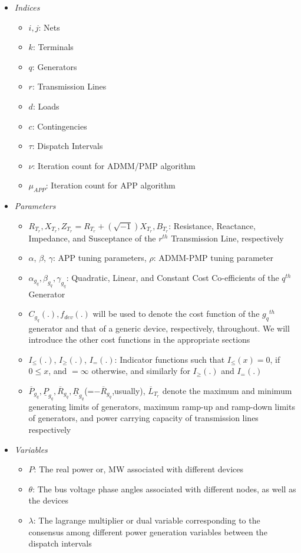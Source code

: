 \documentclass[preprint,12pt,3p]{elsarticle}
\begin{document}
\begin{itemize}
\begin{itemize}[label={}]
		\end{itemize}
		\item \textit{Indices}
		\begin{itemize}[label={}]
			\item $i,j$: Nets
			\item $k$: Terminals
			\item $q$: Generators
			\item $r$: Transmission Lines
			\item $d$: Loads
			\item $c$: Contingencies
			\item $\tau$: Dispatch Intervals
			\item $\nu$: Iteration count for ADMM/PMP algorithm
			\item $\mu_{APP}$: Iteration count for APP algorithm
		\end{itemize}
		\item \textit{Parameters}
		\begin{itemize}[label={}]
			\item $R_{T_r}, X_{T_r}, Z_{T_r}=R_{T_r}+(\sqrt{-1})X_{T_r},  B_{T_r}$: Resistance, Reactance, Impedance, and Susceptance of the $r^{th}$ Transmission Line, respectively
			\item $\alpha$, $\beta$, $\gamma$: APP tuning parameters, $\rho$: ADMM-PMP tuning parameter
			\item $\alpha_{g_q}, \beta_{g_q}, \gamma_{g_q}$: Quadratic, Linear, and Constant Cost Co-efficients of the $q^{th}$ Generator
			\item $C_{g_q}(.), f_{dev}(.)$ will be used to denote the cost function of the ${g_q}^{th}$ generator and that of a generic device, respectively, throughout. We will introduce the other cost functions in the appropriate sections
			\item $I_{\leq}(.)$, $I_{\geq}(.)$, $ I_{=}(.)$: Indicator functions such that $I_{\leq}(x)=0$, if $0\leq x$, and $=\infty$ otherwise, and similarly for $I_{\geq}(.)$ and $ I_{=}(.)$ 
			\item $\overline{P}_{g_q},\underline{P}_{g_q}, \overline{R}_{g_q},\underline{R}_{g_q}$(=$-\overline{R}_{g_q}$,usually), $\overline{L}_{T_r}$ denote the maximum and minimum generating limits of generators, maximum ramp-up and ramp-down limits of generators, and power carrying capacity of transmission lines respectively
		\end{itemize}
		\item \textit{Variables}
		\begin{itemize}[label={}]
			\item $P$: The real power or, MW associated with different devices
			\item $\theta$: The bus voltage phase angles associated with different nodes, as well as the devices
			\item $\lambda$: The lagrange multiplier or dual variable corresponding to the consensus among different power generation variables between the dispatch intervals
		\end{itemize}
	\end{itemize}
\end{document}
